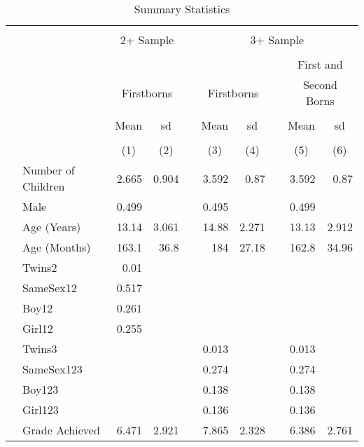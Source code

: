 \begin{table}[ht]
\centering
\caption{Summary Statistics} 
\label{tab:01}
\begin{tabular}{llrrlrrlrr}
  \toprule
   \\[-1.8ex]  & & \multicolumn{2}{c}{2+ Sample} & & \multicolumn{5}{c}{3+ Sample}  \\[0.2ex] \cline{3-4}  \cline{6-10}  \\[-1.2ex]  & & & & & & & & \multicolumn{2}{c}{First and} \\  & & \multicolumn{2}{c}{Firstborns} & & \multicolumn{2}{c}{Firstborns} & & \multicolumn{2}{c}{Second Borns} \\ \cline{3-4}  \cline{6-7} \cline{9-10}  \\[-1.2ex]  & & \multicolumn{1}{c}{Mean} & \multicolumn{1}{c}{sd} & & \multicolumn{1}{c}{Mean} & \multicolumn{1}{c}{sd} & & 
  \multicolumn{1}{c}{Mean} & \multicolumn{1}{c}{sd} \\  \\[-1.8ex] &  & \multicolumn{1}{c}{(1)} & \multicolumn{1}{c}{(2)} &  & 
  \multicolumn{1}{c}{(3)} & \multicolumn{1}{c}{(4)} &  & 
  \multicolumn{1}{c}{(5)} & \multicolumn{1}{c}{(6)}  \\  \midrule
 & Number of Children & 2.665 & 0.904 &  & 3.592 &  0.87 &  & 3.592 &  0.87 \\ 
   & Male & 0.499 &  &  & 0.495 &  &  & 0.499 &  \\ 
   & Age (Years) & 13.14 & 3.061 &  & 14.88 & 2.271 &  & 13.13 & 2.912 \\ 
   & Age (Months) & 163.1 &  36.8 &  &   184 & 27.18 &  & 162.8 & 34.96 \\ 
   & Twins2 &  0.01 &  &  &  &  &  &  &  \\ 
   & SameSex12 & 0.517 &  &  &  &  &  &  &  \\ 
   & Boy12 & 0.261 &  &  &  &  &  &  &  \\ 
   & Girl12 & 0.255 &  &  &  &  &  &  &  \\ 
   & Twins3 &  &  &  & 0.013 &  &  & 0.013 &  \\ 
   & SameSex123 &  &  &  & 0.274 &  &  & 0.274 &  \\ 
   & Boy123 &  &  &  & 0.138 &  &  & 0.138 &  \\ 
   & Girl123 &  &  &  & 0.136 &  &  & 0.136 &  \\ 
   & Grade Achieved & 6.471 & 2.921 &  & 7.865 & 2.328 &  & 6.386 & 2.761 \\ 

\end{tabular}
\end{table}
